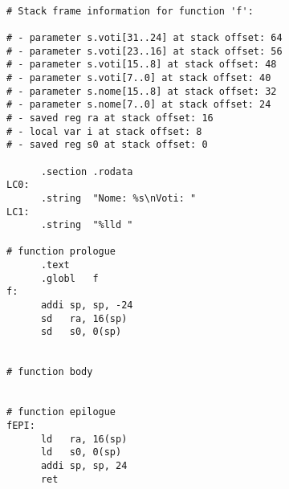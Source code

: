 
\begin{verbatim}

# Stack frame information for function 'f':

# - parameter s.voti[31..24] at stack offset: 64
# - parameter s.voti[23..16] at stack offset: 56
# - parameter s.voti[15..8] at stack offset: 48
# - parameter s.voti[7..0] at stack offset: 40
# - parameter s.nome[15..8] at stack offset: 32
# - parameter s.nome[7..0] at stack offset: 24
# - saved reg ra at stack offset: 16
# - local var i at stack offset: 8
# - saved reg s0 at stack offset: 0

      .section .rodata
LC0:
      .string  "Nome: %s\nVoti: "
LC1:
      .string  "%lld "

# function prologue
      .text
      .globl   f
f:
      addi sp, sp, -24
      sd   ra, 16(sp)
      sd   s0, 0(sp)


# function body


# function epilogue
fEPI:
      ld   ra, 16(sp)
      ld   s0, 0(sp)
      addi sp, sp, 24
      ret
\end{verbatim}